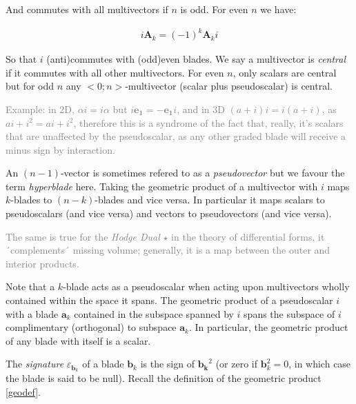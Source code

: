 \documentclass[a4paper]{book}
\numberwithin{equation}{chapter}
\begin{document}
And commutes with all multivectors if $n$ is odd. 
For even $n$ we have:

\begin{align*}
    i\mathbf{A}_k = (-1)^k \mathbf{A}_k i
\end{align*}

So that $i$ (anti)commutes with (odd)even blades.
We say a multivector is \emph{central} if it commutes with all other multivectors.
For even $n$, only scalars are central but for odd $n$ any $<0;n>$-multivector
(scalar plus pseudoscalar) is central.

\textcolor{gray}{Example: in 2D, $\alpha i = i \alpha$ but 
$i\mathbf{e_1} = -\mathbf{e_1}i$, and in 3D $(a+i)i = i(a+i)$, as
$ai+i^2 = ai + i^2$, therefore this is a syndrome of the fact that, really,
it's scalars that are unaffected by the pseudoscalar, as any other graded
blade will receive a minus sign by interaction.}


 \vspace{\baselineskip}
 
An $(n-1)$-vector is sometimes refered to as a \emph{pseudovector} 
but we favour the term \emph{hyperblade} here.
Taking the geometric product of a multivector with $i$ maps $k$-blades to 
$(n-k)$-blades and vice versa. In particular it maps scalars to 
pseudoscalars (and vice versa) and vectors to pseudovectors 
(and vice versa).

\textcolor{gray}{The same is true for the \emph{Hodge Dual} $\star$
in the theory of differential forms, it ´complements´ missing volume;
generally, it is a map between the outer and interior products.}

 \vspace{\baselineskip}
 
Note that a $k$-blade acts as a pseudoscalar when acting upon multivectors 
wholly contained within the space it spans. The geometric product of a 
pseudoscalar $i$ with a blade $\mathbf{a}_k$ 
contained in the subspace spanned by $i$ 
spans the subspace of $i$ complimentary (orthogonal) to subspace
$\mathbf{a}_k$. In 
particular, the geometric product of any blade with itself is a scalar.

 \vspace{\baselineskip}
 
The \emph{signature }$\varepsilon_{\mathbf{b}_k}$ of a blade 
$\mathbf{b}_k$ is the sign of $\mathbf{b_k}^2$ 
(or zero if $\mathbf{b}_k^2 = 0$, 
in which case the blade is said to be null). Recall the definition
of the geometric product \ref{geodef}.
\end{document}
